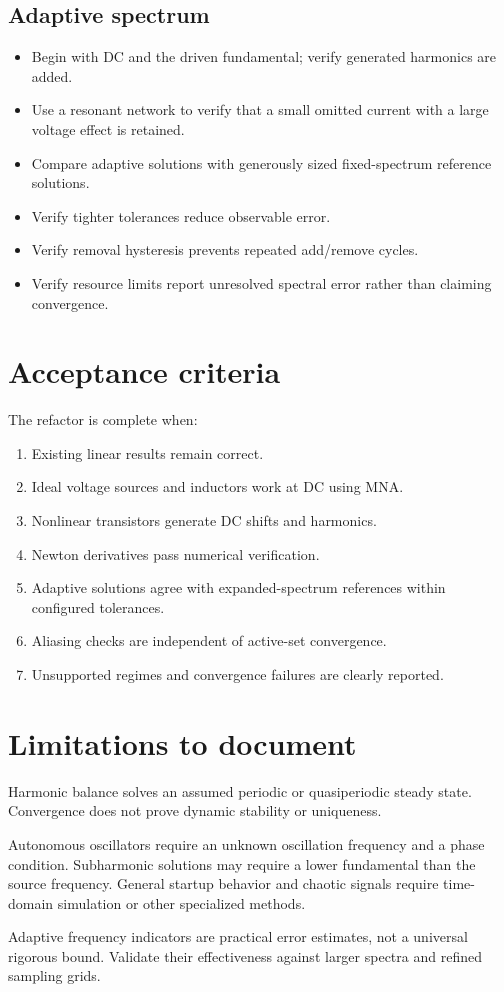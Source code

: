 \documentclass[11pt,a4paper]{article}
\begin{document}
\subsection{Adaptive spectrum}
\begin{itemize}
 \item Begin with DC and the driven fundamental; verify generated
       harmonics are added.
 \item Use a resonant network to verify that a small omitted current with
       a large voltage effect is retained.
 \item Compare adaptive solutions with generously sized fixed-spectrum
       reference solutions.
 \item Verify tighter tolerances reduce observable error.
 \item Verify removal hysteresis prevents repeated add/remove cycles.
 \item Verify resource limits report unresolved spectral error rather
       than claiming convergence.
\end{itemize}

\section{Acceptance criteria}

The refactor is complete when:
\begin{enumerate}
 \item Existing linear results remain correct.
 \item Ideal voltage sources and inductors work at DC using MNA.
 \item Nonlinear transistors generate DC shifts and harmonics.
 \item Newton derivatives pass numerical verification.
 \item Adaptive solutions agree with expanded-spectrum references within
       configured tolerances.
 \item Aliasing checks are independent of active-set convergence.
 \item Unsupported regimes and convergence failures are clearly reported.
\end{enumerate}

\section{Limitations to document}

Harmonic balance solves an assumed periodic or quasiperiodic steady
state. Convergence does not prove dynamic stability or uniqueness.

Autonomous oscillators require an unknown oscillation frequency and a
phase condition. Subharmonic solutions may require a lower fundamental
than the source frequency. General startup behavior and chaotic signals
require time-domain simulation or other specialized methods.

Adaptive frequency indicators are practical error estimates, not a
universal rigorous bound. Validate their effectiveness against larger
spectra and refined sampling grids.
\end{document}
